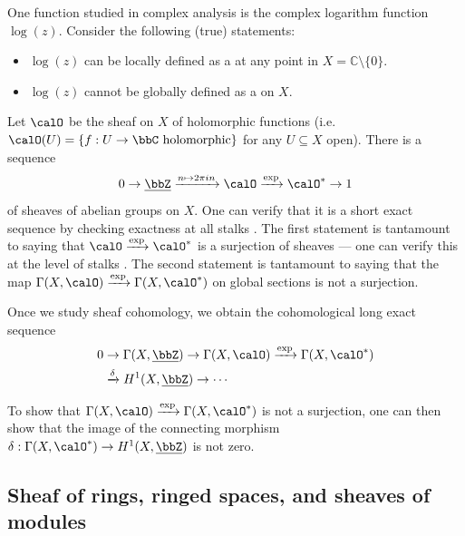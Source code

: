 \begin{example} \label{example:exact_sequence_of_exponential_of_holomorphic_functions}
One function studied in complex analysis is the complex logarithm function $\log(z)$. Consider the following (true) statements:
\begin{itemize}
    \item $\log(z)$ can be locally defined as a  at any point in $X = \mathbb{C} \setminus \{0\}$. 
    \item $\log(z)$ cannot be globally defined as a  on $X$.
\end{itemize}


Let $\calO$ be the sheaf on $X$ of holomorphic functions (i.e. $\calO(U) = \{f: U \to \bbC \text{ holomorphic}\}$ for any $U \subseteq X$ open).  There is a sequence
$$0 \to \underline{\bbZ} \xrightarrow{n \mapsto 2 \pi i n} \calO \xrightarrow{\exp} \calO^* \to 1$$
of sheaves of abelian groups on $X$. One can verify that it is a short exact sequence by checking exactness at all stalks \TODO{}. The first statement is tantamount to saying that $\calO \xrightarrow{\exp} \calO^*$ is a surjection of sheaves \TODO{} --- one can verify this at the level of stalks . The second statement is tantamount to saying that the map $\Gamma(X, \calO) \xrightarrow{\exp} \Gamma(X, \calO^*)$ on global sections is not a surjection. 

\TODO{}
Once we study sheaf cohomology, we obtain the cohomological long exact sequence 
\begin{align*}
0 &\to \Gamma(X, \underline{\bbZ}) \to \Gamma(X, \calO) \xrightarrow{\exp} \Gamma(X, \calO^*) \\
&\xrightarrow{\delta} H^1(X, \underline{\bbZ}) \to \cdots
\end{align*}

To show that $\Gamma(X, \calO) \xrightarrow{\exp} \Gamma(X, \calO^*)$ is not a surjection, one can then show that the image of the connecting morphism $\delta: \Gamma(X, \calO^*) \to H^1(X, \underline{\bbZ})$ is not zero. 
\end{example}


\subsection{Sheaf of rings, ringed spaces, and sheaves of modules}

